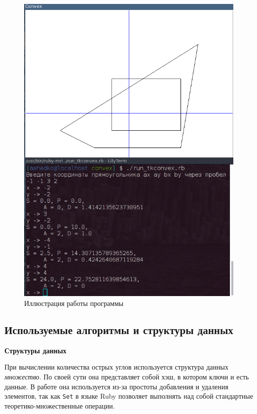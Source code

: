 \begin{figure}[ht!]
\begin{center}
\includegraphics[scale=0.6]{images/convex_ill}
\end{center}
\vspace*{-8mm}
\caption{Иллюстрация работы программы}\label{fig:conv_ill}
\end{figure}

\newpage

\subsection{Используемые алгоритмы и структуры данных}

\textbf{Структуры данных}

При вычислении количества острых углов используется структура данных \emph{множество}. По своей сути она представляет собой хэш, в котором ключи и есть данные. В работе она используется из-за простоты добавления и удаления элементов, так как \verb|Set| в языке Ruby позволяет выполнять над собой стандартные теоретико-множественные операции.

